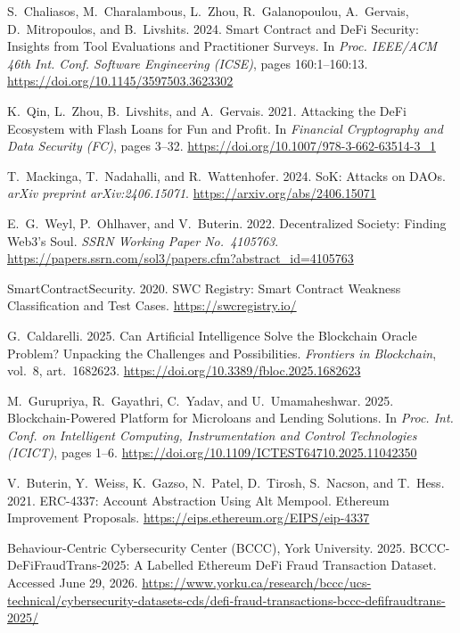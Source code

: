 \documentclass[12pt,a4paper]{report}
\begin{document}
{\begin{enumerate}[label={[\arabic*]}]
\item S.~Chaliasos, M.~Charalambous, L.~Zhou, R.~Galanopoulou, A.~Gervais, D.~Mitropoulos, and B.~Livshits. 2024. Smart Contract and DeFi Security: Insights from Tool Evaluations and Practitioner Surveys. In \emph{Proc. IEEE/ACM 46th Int. Conf. Software Engineering (ICSE)}, pages 160:1--160:13. \url{https://doi.org/10.1145/3597503.3623302}


\item K.~Qin, L.~Zhou, B.~Livshits, and A.~Gervais. 2021. Attacking the DeFi Ecosystem with Flash Loans for Fun and Profit. In \emph{Financial Cryptography and Data Security (FC)}, pages 3--32. \url{https://doi.org/10.1007/978-3-662-63514-3_1}


\item T.~Mackinga, T.~Nadahalli, and R.~Wattenhofer. 2024. SoK: Attacks on DAOs. \emph{arXiv preprint arXiv:2406.15071}. \url{https://arxiv.org/abs/2406.15071}


\item E.~G.~Weyl, P.~Ohlhaver, and V.~Buterin. 2022. Decentralized Society: Finding Web3's Soul. \emph{SSRN Working Paper No.~4105763}. \url{https://papers.ssrn.com/sol3/papers.cfm?abstract_id=4105763}


\item SmartContractSecurity. 2020. SWC Registry: Smart Contract Weakness Classification and Test Cases. \url{https://swcregistry.io/}


\item G.~Caldarelli. 2025. Can Artificial Intelligence Solve the Blockchain Oracle Problem? Unpacking the Challenges and Possibilities. \emph{Frontiers in Blockchain}, vol.~8, art.~1682623. \url{https://doi.org/10.3389/fbloc.2025.1682623}


\item M.~Gurupriya, R.~Gayathri, C.~Yadav, and U.~Umamaheshwar. 2025. Blockchain-Powered Platform for Microloans and Lending Solutions. In \emph{Proc. Int. Conf. on Intelligent Computing, Instrumentation and Control Technologies (ICICT)}, pages 1--6. \url{https://doi.org/10.1109/ICTEST64710.2025.11042350}


\item V.~Buterin, Y.~Weiss, K.~Gazso, N.~Patel, D.~Tirosh, S.~Nacson, and T.~Hess. 2021. ERC-4337: Account Abstraction Using Alt Mempool. Ethereum Improvement Proposals. \url{https://eips.ethereum.org/EIPS/eip-4337}


\item Behaviour-Centric Cybersecurity Center (BCCC), York University. 2025. BCCC-DeFiFraudTrans-2025: A Labelled Ethereum DeFi Fraud Transaction Dataset. Accessed June 29, 2026. \url{https://www.yorku.ca/research/bccc/ucs-technical/cybersecurity-datasets-cds/defi-fraud-transactions-bccc-defifraudtrans-2025/}


\end{enumerate}}
\end{document}
